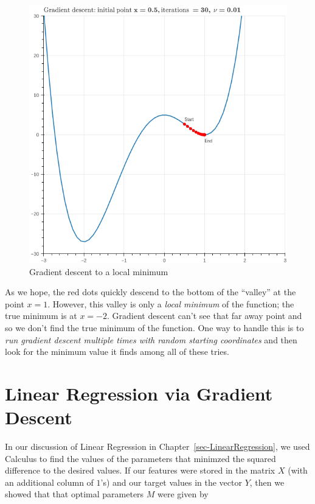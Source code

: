 \documentclass[
  11pt,
  letterpaper,
]{scrbook}
\theoremstyle{plain}
\theoremstyle{plain}
\theoremstyle{remark}
\begin{document}
\begin{figure}

{\centering \includegraphics{chapters/img/grad_descent_local_minimum.png}

}

\caption{\label{fig-grad_descent_local_minimum}Gradient descent to a
local minimum}

\end{figure}

As we hope, the red dots quickly descend to the bottom of the ``valley''
at the point \(x=1\). However, this valley is only a \emph{local
minimum} of the function; the true minimum is at \(x=-2\). Gradient
descent can't see that far away point and so we don't find the true
minimum of the function. One way to handle this is to \emph{run gradient
descent multiple times with random starting coordinates} and then look
for the minimum value it finds among all of these tries.

\hypertarget{linear-regression-via-gradient-descent}{%
\section{Linear Regression via Gradient
Descent}\label{linear-regression-via-gradient-descent}}

In our discussion of Linear Regression in
Chapter~\ref{sec-LinearRegression}, we used Calculus to find the values
of the parameters that minimzed the squared difference to the desired
values. If our features were stored in the matrix \(X\) (with an
additional column of \(1\)'s) and our target values in the vector \(Y\),
then we showed that that optimal parameters \(M\) were given by
\end{document}
